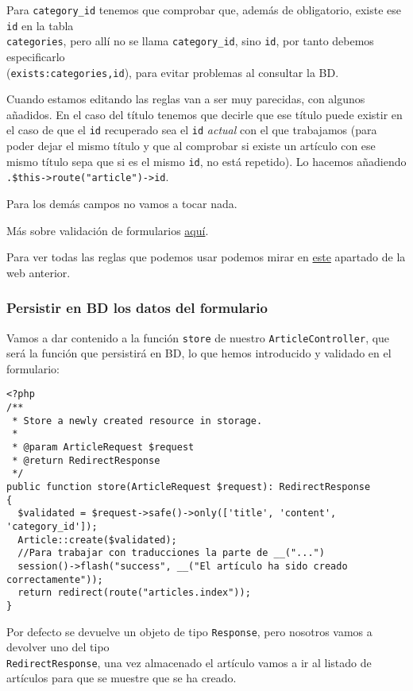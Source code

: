 \documentclass[11pt]{article}
\begin{document}
Para \texttt{category\_id} tenemos que comprobar que, además de obligatorio,
existe ese \texttt{id} en la tabla \\
\texttt{categories}, pero allí no se llama \texttt{category\_id}, sino \texttt{id}, por
tanto debemos especificarlo \\
(\texttt{exists:categories,id}), para evitar problemas al consultar la BD.

Cuando estamos editando las reglas van a ser muy parecidas, con
algunos añadidos. En el caso del título tenemos que decirle que ese
título puede existir en el caso de que el \texttt{id} recuperado sea el \texttt{id}
\emph{actual} con el que trabajamos (para poder dejar el mismo título y que
al comprobar si existe un artículo con ese mismo título sepa que si es
el mismo \texttt{id}, no está repetido). Lo hacemos añadiendo
\texttt{.\$this->route("article")->id}.

Para los demás campos no vamos a tocar nada.

Más sobre validación de formularios \href{https://laravel.com/docs/9.x/validation\#form-request-validation}{aquí}.

Para ver todas las reglas que podemos usar podemos mirar en \href{https://laravel.com/docs/9.x/validation\#available-validation-rules}{este}
apartado de la web anterior.


\subsubsection{Persistir en BD los datos del formulario}
\label{sec:orge4a504e}
Vamos a dar contenido a la función \texttt{store} de nuestro
\texttt{ArticleController}, que será la función que persistirá en BD, lo que
hemos introducido y validado en el formulario:
\begin{verbatim}
<?php
/**
 * Store a newly created resource in storage.
 *
 * @param ArticleRequest $request
 * @return RedirectResponse
 */
public function store(ArticleRequest $request): RedirectResponse
{
  $validated = $request->safe()->only(['title', 'content', 'category_id']);
  Article::create($validated);
  //Para trabajar con traducciones la parte de __("...")
  session()->flash("success", __("El artículo ha sido creado correctamente"));
  return redirect(route("articles.index"));
}
\end{verbatim}
Por defecto se devuelve un objeto de tipo \texttt{Response}, pero nosotros
vamos a devolver uno del tipo \\
\texttt{RedirectResponse}, una vez almacenado el artículo vamos a ir al
listado de artículos para que se muestre que se ha creado.
\end{document}
